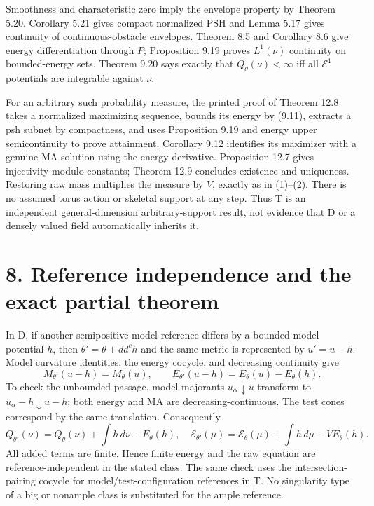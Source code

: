 \documentclass[11pt]{article}
\begin{document}
Smoothness and characteristic zero imply the envelope property by Theorem 5.20. Corollary 5.21 gives compact normalized PSH and Lemma 5.17 gives continuity of continuous-obstacle envelopes. Theorem 8.5 and Corollary 8.6 give energy differentiation through \(P\); Proposition 9.19 proves \(L^1(\nu)\) continuity on bounded-energy sets. Theorem 9.20 says exactly that \(Q_\theta(\nu)<\infty\) iff all \(\mathcal E^1\) potentials are integrable against \(\nu\).

For an arbitrary such probability measure, the printed proof of Theorem 12.8 takes a normalized maximizing sequence, bounds its energy by (9.11), extracts a psh subnet by compactness, and uses Proposition 9.19 and energy upper semicontinuity to prove attainment. Corollary 9.12 identifies its maximizer with a genuine MA solution using the energy derivative. Proposition 12.7 gives injectivity modulo constants; Theorem 12.9 concludes existence and uniqueness. Restoring raw mass multiplies the measure by \(V\), exactly as in (1)--(2). There is no assumed torus action or skeletal support at any step. Thus T is an independent general-dimension arbitrary-support result, not evidence that D or a densely valued field automatically inherits it.

\section*{8. Reference independence and the exact partial theorem}

In D, if another semipositive model reference differs by a bounded model potential \(h\), then \(\theta'=\theta+dd^ch\) and the same metric is represented by \(u'=u-h\). Model curvature identities, the energy cocycle, and decreasing continuity give
\[
 M_{\theta'}(u-h)=M_\theta(u),\qquad
 E_{\theta'}(u-h)=E_\theta(u)-E_\theta(h).
 \tag{18}
\]
To check the unbounded passage, model majorants \(u_\alpha\downarrow u\) transform to \(u_\alpha-h\downarrow u-h\); both energy and MA are decreasing-continuous. The test cones correspond by the same translation. Consequently
\[
 Q_{\theta'}(\nu)=Q_\theta(\nu)+\int h\,d\nu-E_\theta(h),
 \quad
 \mathscr E_{\theta'}(\mu)=\mathscr E_\theta(\mu)+\int h\,d\mu-VE_\theta(h).
 \tag{19}
\]
All added terms are finite. Hence finite energy and the raw equation are reference-independent in the stated class. The same check uses the intersection-pairing cocycle for model/test-configuration references in T. No singularity type of a big or nonample class is substituted for the ample reference.
\end{document}
